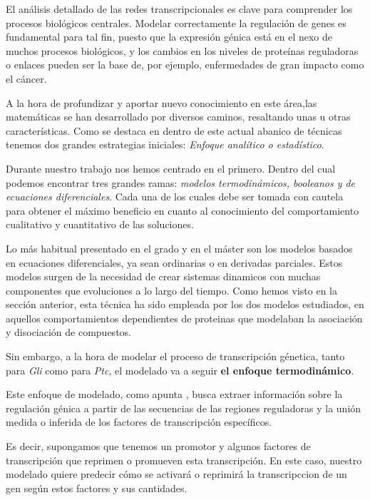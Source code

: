  El análisis detallado de las redes transcripcionales es clave para comprender los procesos biológicos centrales. Modelar correctamente la regulación de genes es fundamental para tal fin, puesto que la expresión génica está en el nexo de muchos procesos biológicos, y los cambios en los niveles de proteínas reguladoras o enlaces pueden ser la base de, por ejemplo, enfermedades de gran impacto como el cáncer. 
 
  A la hora de profundizar y aportar nuevo conocimiento en este área,las matemáticas se han desarrollado por diversos caminos, resaltando unas u otras características. Como se destaca en \cite{ay2011mathematical} dentro de este actual abanico de técnicas tenemos dos grandes estrategias iniciales: \textit{Enfoque analítico o estadístico}. 
  
  Durante nuestro trabajo nos hemos centrado en el primero. Dentro del cual podemos encontrar tres grandes ramas: \textit{modelos termodinámicos, booleanos y de ecuaciones diferenciales}. Cada una de los cuales debe ser tomada con cautela para obtener el máximo beneficio en cuanto al conocimiento del comportamiento cualitativo y cuantitativo de las soluciones. 
 
 Lo más habitual presentado en el grado y en el máster son los modelos basados en ecuaciones diferenciales, ya sean ordinarias o en derivadas parciales. Estos modelos surgen de la necesidad de crear sistemas dinamicos con muchas componentes que evoluciones a lo largo del tiempo. Como hemos visto en la sección anterior, esta técnica ha sido empleada por los dos modelos estudiados, en aquellos comportamientos dependientes de proteinas que modelaban la asociación y disociación de compuestos.
 
 Sin embargo, a la hora de modelar el proceso de transcripción génetica, tanto para \textit{Gli} como para \textit{Ptc}, el modelado va a seguir \textbf{el enfoque termodinámico}. 
 
 Este enfoque de modelado, como apunta \cite{ay2011mathematical}, busca extraer información sobre la regulación génica a partir de las secuencias de las regiones reguladoras y la unión medida o inferida de los factores de transcripción específicos.
 
 Es decir, supongamos que tenemos un promotor y algunos factores de transcripción que reprimen o promueven esta transcripción. En este caso, nuestro modelado quiere predecir cómo se activará o reprimirá la transcripccion de un gen según estos factores y sus cantidades.
 
